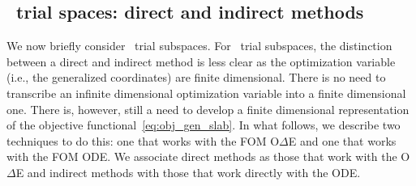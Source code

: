 \subsection{\spaceTimeAcronym\ trial spaces: direct and indirect methods}
We now briefly consider \spaceTimeAcronym\ trial subspaces. 
For \spaceTimeAcronym\ trial subspaces, the distinction between a direct and indirect method is less clear as the optimization variable (i.e., the generalized coordinates) are finite 
dimensional. There is no need to transcribe an infinite dimensional optimization variable into a finite dimensional one. There is, however, still a need to develop a finite 
dimensional representation of the objective functional~\eqref{eq:obj_gen_slab}. In what follows, we describe two techniques to do this: one that works with the FOM O$\Delta$E and one that works with the FOM ODE. We associate direct methods as those 
that work with the O$\Delta$E and indirect methods with those that work directly with the ODE.  

